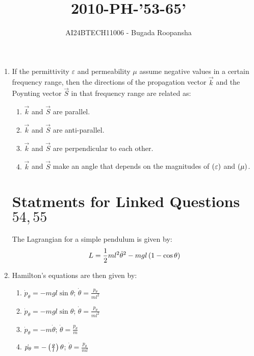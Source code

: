 \documentclass[journal,12pt,twocolumn]{IEEEtran}
\theoremstyle{remark}
\begin{document}

\vspace{3cm}
\title{2010-PH-'53-65'}
\author{AI24BTECH11006 - Bugada Roopansha}
\maketitle

\begin{enumerate}[start=53]
 


    \item If the permittivity $ \varepsilon $ and permeability $ \mu $ assume negative values in a certain frequency range, then the directions of the propagation vector $ \vec{k} $ and the Poynting vector $ \vec{S} $ in that frequency range are related as:

    \begin{enumerate}
        \item $ \vec{k} $ and $ \vec{S} $ are parallel.
        \item $ \vec{k} $ and $ \vec{S} $ are anti-parallel.
        \item $ \vec{k} $ and $ \vec{S} $ are perpendicular to each other.
        \item $ \vec{k} $ and $ \vec{S} $ make an angle that depends on the magnitudes of $ \left(\varepsilon\right) $ and $ \left(\mu\right) $.
    \end{enumerate}
   \section{Statments for Linked Questions $54,55$}     
     The Lagrangian for a simple pendulum is given by:
    \[
    L = \frac{1}{2} m l^2 \dot{\theta}^2 - mg l \left(1 - \cos \theta\right)
    \]
    
   \item  Hamilton's equations are then given by:
    \begin{enumerate}
        \item $ \dot{p}_\theta = -mg l \sin \theta $; $ \dot{\theta} = \frac{p_\theta}{m l^2} $
        \item $ \dot{p}_\theta = -mg l \sin \theta $; $\dot{\theta} = \frac{p_\theta}{m l^2} $
        \item $ \dot{p}_\theta = -m \dot{\theta} $; $ \dot{\theta} = \frac{p_\theta}{m } $
        \item $ \dot{p_\theta}=-\left(\frac{g}{l}\right) \theta $; $ \dot{\theta} = \frac{p_\theta}{m l} $
    \end{enumerate}


\end{enumerate}
\end{document}
